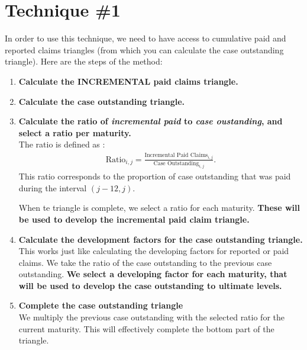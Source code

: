 \documentclass[11pt, english]{memoir}
\numberwithin{definition}{section}
\begin{document}
\section{Technique \#1}
	In order to use this technique, we need to have access to cumulative paid and reported claims triangles (from which you can calculate the case outstanding triangle). Here are the steps of the method: 
	\begin{enumerate}
		\item \textbf{Calculate the INCREMENTAL paid claims triangle.}\\
		
		\item \textbf{Calculate the case outstanding triangle.}\\
		
		\item \textbf{Calculate the ratio of \emph{incremental paid} to \emph{case oustanding}, and select a ratio per maturity.}\\
		The ratio is defined as :
		\begin{align*}
		\text{Ratio}_{i,j} = \frac{\text{Incremental Paid Claims}_{i,j}}{\text{Case Outstanding}_{i,j}}.
		\end{align*}
		This ratio corresponds to the proportion of case outstanding that was paid during the interval $ (j-12, j) $.
		
		When te triangle is complete, we select a ratio for each maturity. \textbf{These will be used to develop the incremental paid claim triangle. }\\
		
		
		\item \textbf{Calculate the development factors for the case outstanding triangle.}\\
		This works just like calculating the developing factors for reported or paid claims. We take the ratio of the case outstanding to the previous case outstanding. \textbf{We select a developing factor for each maturity, that will be used to develop the case outstanding to ultimate levels.} \\
		
		
		
		\item \textbf{Complete the case outstanding triangle}\\
		We multiply the previous case outstanding with the selected ratio for the current maturity. This will effectively complete the bottom part of the triangle. \\
		

\end{enumerate}
\end{document}
